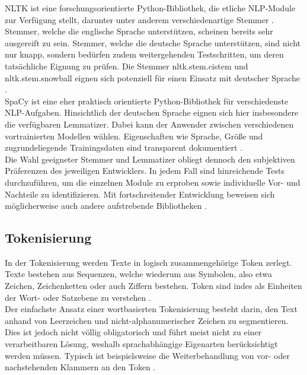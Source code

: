 \noindent
\ac{NLTK} ist eine forschungsorientierte Python-Bibliothek, die etliche \ac{NLP}-Module zur Verfügung stellt, darunter unter anderem verschiedenartige Stemmer \cite[S.~13-14]{BIR09}. Stemmer, welche die englische Sprache unterstützen, scheinen bereits sehr ausgereift zu sein. Stemmer, welche die deutsche Sprache unterstützen, sind nicht nur knapp, sondern bedürfen zudem weitergehenden Testschritten, um deren tatsächliche Eignung zu prüfen. Die Stemmer nltk.stem.cistem und nltk.stem.snowball eignen sich potenziell für einen Einsatz mit deutscher Sprache \cite{NLT20}.\\

\noindent
SpaCy ist eine eher praktisch orientierte Python-Bibliothek für verschiedenste \ac{NLP}-Aufgaben. Hinsichtlich der deutschen Sprache eignen sich hier insbesondere die verfügbaren Lemmatizer. Dabei kann der Anwender zwischen verschiedenen vortrainierten Modellen wählen. Eigenschaften wie Sprache, Größe und zugrundeliegende Trainingsdaten sind transparent dokumentiert \cite{SPA21}.\\

\noindent
Die Wahl geeigneter Stemmer und Lemmatizer obliegt dennoch den subjektiven Präferenzen des jeweiligen Entwicklers. In jedem Fall sind hinreichende Tests durchzuführen, um die einzelnen Module zu erproben sowie individuelle Vor- und Nachteile zu identifizieren. Mit fortschreitender Entwicklung beweisen sich möglicherweise auch andere aufstrebende Bibliotheken \cite[S.~108]{BIR09}.
\newpage


\subsection{Tokenisierung}
\noindent
In der Tokenisierung werden Texte in logisch zusammengehörige Token zerlegt. Texte bestehen aus Sequenzen, welche wiederum aus Symbolen, also etwa Zeichen, Zeichenketten oder auch Ziffern bestehen. Token sind indes als Einheiten der Wort- oder Satzebene zu verstehen \cite[S.~22-24]{MAN08}.\\

\noindent
Der einfachste Ansatz einer wortbasierten Tokenisierung besteht darin, den Text anhand von Leerzeichen und nicht-alphanumerischer Zeichen zu segmentieren. Dies ist jedoch nicht völlig obligatorisch und führt meist nicht zu einer verarbeitbaren Lösung, weshalb sprachabhängige Eigenarten berücksichtigt werden müssen. Typisch ist beispielsweise die Weiterbehandlung von vor- oder nachstehenden Klammern an den Token \cite[S.~109-111]{BIR09}.\\


